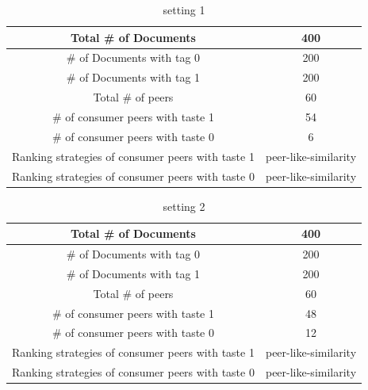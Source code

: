 \documentclass [12pt]{article} \usepackage{multicol}
\begin{document}
\begin{table}[h!]
\caption{setting 1}
\begin{center}


\begin{tabular}{|c|c|}
\hline

Total \# of Documents &  400  \\ \hline
\# of Documents with tag 0 &  200  \\ \hline
\# of Documents with tag 1 &  200  \\ \hline

Total \# of peers & 60 \\ \hline

\# of consumer peers with taste 1  & 54 \\ \hline 
\# of consumer peers with taste 0  &  6\\ \hline

Ranking strategies of consumer peers with taste 1  & peer-like-similarity \\ \hline 
Ranking strategies of consumer peers with taste 0  &  peer-like-similarity\\ \hline


\end{tabular}

\end{center}
\label{default}
\end{table}



\begin{table}[h!]
\caption{setting 2}
\begin{center}


\begin{tabular}{|c|c|}
\hline

Total \# of Documents &  400  \\ \hline
\# of Documents with tag 0 &  200  \\ \hline
\# of Documents with tag 1 &  200  \\ \hline

Total \# of peers & 60 \\ \hline
\# of consumer peers with taste 1  &  48 \\ \hline 
\# of consumer peers with taste 0  &  12 \\ \hline

Ranking strategies of consumer peers with taste 1  & peer-like-similarity \\ \hline 
Ranking strategies of consumer peers with taste 0  &  peer-like-similarity\\ \hline

\end{tabular}

\end{center}
\label{default}
\end{table}
\end{document}

